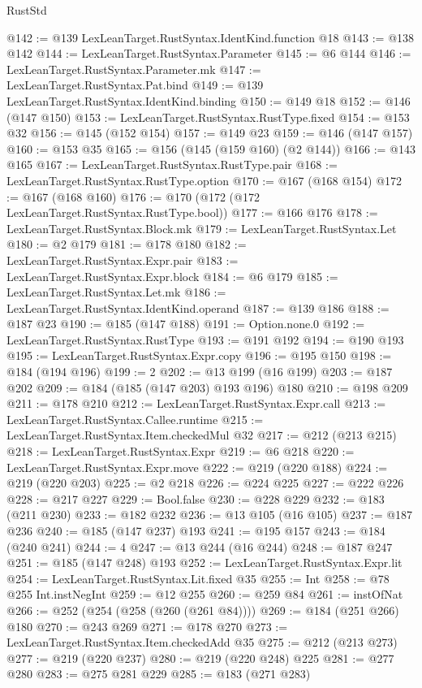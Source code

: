 \begin{lexlean}{RustStd}
\begin{coremodule}
@142 := @139 LexLeanTarget.RustSyntax.IdentKind.function @18
@143 := @138 @142
@144 := LexLeanTarget.RustSyntax.Parameter
@145 := @6 @144
@146 := LexLeanTarget.RustSyntax.Parameter.mk
@147 := LexLeanTarget.RustSyntax.Pat.bind
@149 := @139 LexLeanTarget.RustSyntax.IdentKind.binding
@150 := @149 @18
@152 := @146 (@147 @150)
@153 := LexLeanTarget.RustSyntax.RustType.fixed
@154 := @153 @32
@156 := @145 (@152 @154)
@157 := @149 @23
@159 := @146 (@147 @157)
@160 := @153 @35
@165 := @156 (@145 (@159 @160) (@2 @144))
@166 := @143 @165
@167 := LexLeanTarget.RustSyntax.RustType.pair
@168 := LexLeanTarget.RustSyntax.RustType.option
@170 := @167 (@168 @154)
@172 := @167 (@168 @160)
@176 := @170 (@172 (@172 LexLeanTarget.RustSyntax.RustType.bool))
@177 := @166 @176
@178 := LexLeanTarget.RustSyntax.Block.mk
@179 := LexLeanTarget.RustSyntax.Let
@180 := @2 @179
@181 := @178 @180
@182 := LexLeanTarget.RustSyntax.Expr.pair
@183 := LexLeanTarget.RustSyntax.Expr.block
@184 := @6 @179
@185 := LexLeanTarget.RustSyntax.Let.mk
@186 := LexLeanTarget.RustSyntax.IdentKind.operand
@187 := @139 @186
@188 := @187 @23
@190 := @185 (@147 @188)
@191 := Option.none.{0}
@192 := LexLeanTarget.RustSyntax.RustType
@193 := @191 @192
@194 := @190 @193
@195 := LexLeanTarget.RustSyntax.Expr.copy
@196 := @195 @150
@198 := @184 (@194 @196)
@199 := 2
@202 := @13 @199 (@16 @199)
@203 := @187 @202
@209 := @184 (@185 (@147 @203) @193 @196) @180
@210 := @198 @209
@211 := @178 @210
@212 := LexLeanTarget.RustSyntax.Expr.call
@213 := LexLeanTarget.RustSyntax.Callee.runtime
@215 := LexLeanTarget.RustSyntax.Item.checkedMul @32
@217 := @212 (@213 @215)
@218 := LexLeanTarget.RustSyntax.Expr
@219 := @6 @218
@220 := LexLeanTarget.RustSyntax.Expr.move
@222 := @219 (@220 @188)
@224 := @219 (@220 @203)
@225 := @2 @218
@226 := @224 @225
@227 := @222 @226
@228 := @217 @227
@229 := Bool.false
@230 := @228 @229
@232 := @183 (@211 @230)
@233 := @182 @232
@236 := @13 @105 (@16 @105)
@237 := @187 @236
@240 := @185 (@147 @237) @193
@241 := @195 @157
@243 := @184 (@240 @241)
@244 := 4
@247 := @13 @244 (@16 @244)
@248 := @187 @247
@251 := @185 (@147 @248) @193
@252 := LexLeanTarget.RustSyntax.Expr.lit
@254 := LexLeanTarget.RustSyntax.Lit.fixed @35
@255 := Int
@258 := @78 @255 Int.instNegInt
@259 := @12 @255
@260 := @259 @84
@261 := instOfNat
@266 := @252 (@254 (@258 (@260 (@261 @84))))
@269 := @184 (@251 @266) @180
@270 := @243 @269
@271 := @178 @270
@273 := LexLeanTarget.RustSyntax.Item.checkedAdd @35
@275 := @212 (@213 @273)
@277 := @219 (@220 @237)
@280 := @219 (@220 @248) @225
@281 := @277 @280
@283 := @275 @281 @229
@285 := @183 (@271 @283)

\end{coremodule}
\end{lexlean}
